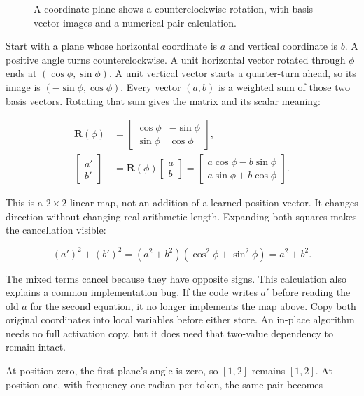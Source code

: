 \documentclass[
  10pt,
]{article}
\begin{document}
\begin{figure}[H]\centering\resizebox{\linewidth}{!}{}\caption{A coordinate plane shows a counterclockwise rotation, with basis-vector images and a numerical pair calculation.}\end{figure}

Start with a plane whose horizontal coordinate is \(a\) and vertical
coordinate is \(b\). A positive angle turns counterclockwise. A unit
horizontal vector rotated through \(\phi\) ends at
\((\cos\phi,\sin\phi)\). A unit vertical vector starts a quarter-turn
ahead, so its image is \((-\sin\phi,\cos\phi)\). Every vector \((a,b)\)
is a weighted sum of those two basis vectors. Rotating that sum gives
the matrix and its scalar meaning:

\[
\begin{aligned}
\mathbf{R}(\phi)&=
\begin{bmatrix}\cos\phi&-\sin\phi\\\sin\phi&\cos\phi\end{bmatrix},\\
\begin{bmatrix}a'\\b'\end{bmatrix}
&=\mathbf{R}(\phi)\begin{bmatrix}a\\b\end{bmatrix}
=\begin{bmatrix}a\cos\phi-b\sin\phi\\a\sin\phi+b\cos\phi\end{bmatrix}.
\end{aligned}
\]

This is a \(2\times2\) linear map, not an addition of a learned position
vector. It changes direction without changing real-arithmetic length.
Expanding both squares makes the cancellation visible:

\[
(a')^2+(b')^2
=(a^2+b^2)(\cos^2\phi+\sin^2\phi)=a^2+b^2.
\]

The mixed terms cancel because they have opposite signs. This
calculation also explains a common implementation bug. If the code
writes \(a'\) before reading the old \(a\) for the second equation, it
no longer implements the map above. Copy both original coordinates into
local variables before either store. An in-place algorithm needs no full
activation copy, but it does need that two-value dependency to remain
intact.

At position zero, the first plane's angle is zero, so \([1,2]\) remains
\([1,2]\). At position one, with frequency one radian per token, the
same pair becomes
\end{document}
